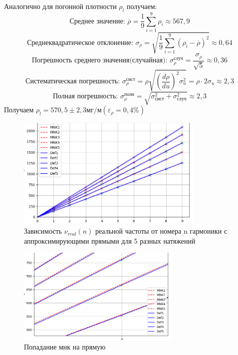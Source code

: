 \documentclass[a4paper]{article}
\begin{document}
Аналогично для погонной плотности $\rho_{l}$ получаем:
\[\text{Среднее значение:  } \overline{\rho} = \frac{1}{9}\sum\limits_{i=1}^{9} \rho_{i} \approx 567,9\]
\[\text{Среднеквадратическое отклонение:  } \sigma_{\rho} = \sqrt{\frac{1}{9}\sum\limits_{i=1}^{9} (\rho_{i} - \overline{\rho})^2} \approx 0,64\]
\[\text{Погрешность среднего значения(случайная):  } \sigma_{\rho}^{\text{случ}} = \frac{\sigma_{\rho}}{\sqrt{5}} \approx 0,36\]
\[\text{Систематическая погрешность:  }\sigma_{\rho}^{\text{сист}} = \rho\sqrt{\left( \frac{d\rho}{du}\right)^2 \sigma_{u}^2} = \rho \cdot 2\sigma_{u}\approx 2,3\]
\[\text{Полная погрешность:  }\sigma_{\rho}^{\text{полн}} = \sqrt{\sigma_{\text{сист}}^2 + \sigma_{\text{случ}}^2} \approx 2,3\]
Получаем $\rho_{l} = 570,5 \pm 2,3 \text{мг}/\text{м} (\varepsilon_{\rho} = 0,4\%)$\par

\newpage
\begin{figure}[t]
    \centering
    \includegraphics[width=0.8\textwidth]{pick2.png}
    \caption{Зависимость $\nu_{real}(n)$ реальной частоты от номера n гармоники с аппроксимирующими прямыми для 5 разных натяжений}
\end{figure}

\begin{figure}[t]
    \centering
    \includegraphics[width=0.7\textwidth]{pick3.png}
    \caption{Попадание мнк на прямую}
\end{figure}
\end{document}
